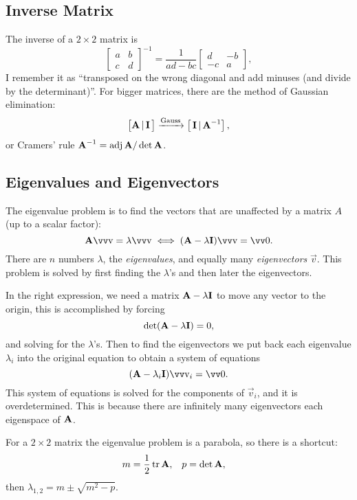 \subsection{Inverse Matrix}

The inverse of a \(2 \times 2\) matrix is
\[
	\begin{bmatrix}
		a & b \\
		c & d
	\end{bmatrix}^{-1}
	=
	\frac{1}{ad - bc}
	\begin{bmatrix}
		d & -b \\
		-c & a
	\end{bmatrix},
\]
I remember it as ``transposed on the wrong diagonal and add minuses (and divide by the determinant)''. For bigger matrices, there are the method of Gaussian elimination: 
\[
	\begin{bmatrix} \bm{\mathrm{A}} \,|\, \bm{\mathrm{I}} \, \end{bmatrix}
		\xrightarrow{\text{Gauss}}
	\begin{bmatrix} \, \bm{\mathrm{I}} \,|\, \bm{\mathrm{A}}^{-1} \end{bmatrix},
\]
or Cramers' rule \( \bm{\mathrm{A}}^{-1} = \operatorname{adj} \bm{\mathrm{A}} / \det \bm{\mathrm{A}}\).

\subsection{Eigenvalues and Eigenvectors}

The eigenvalue problem is to find the vectors that are unaffected by a matrix \(A\) (up to a scalar factor):
\[
	\mx{A} \vec{v} = \lambda \vec{v} \iff (\mx{A} - \lambda \mx{I}) \vec{v} = \vec{0}.
\]
There are \(n\) numbers \(\lambda\), the \emph{eigenvalues}, and equally many \emph{eigenvectors} \(\vec{v}\). This problem is solved by first finding the \(\lambda\)'s and then later the eigenvectors.

In the right expression, we need a matrix \(\bm{\mathrm{A}} - \lambda \bm{\mathrm{I}}\) to move any vector to the origin, this is accomplished by forcing
\[
	\det (\bm{\mathrm{A}} - \lambda \bm{\mathrm{I}}) = 0,
\]
and solving for the \(\lambda\)'s. Then to find the eigenvectors we put back each eigenvalue \(\lambda_i\) into the original equation to obtain a system of equations
\[
	(\mx{A} - \lambda_i \mx{I}) \vec{v}_i = \vec{0}.
\]
This system of equations is solved for the components of \(\vec{v}_i\), and it is overdetermined. This is because there are infinitely many eigenvectors each eigenspace of \(\bm{\mathrm{A}}\).

For a \(2 \times 2\) matrix the eigenvalue problem is a parabola, so there is a shortcut:
\begin{align*}
	m &= \frac{1}{2} \operatorname{tr} \bm{\mathrm{A}}, & p &= \det \bm{\mathrm{A}},
\end{align*}
then \(\lambda_{1,2} = m \pm \sqrt{m^2 - p}\).

